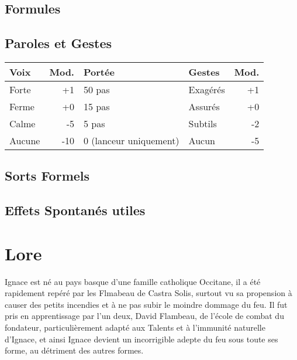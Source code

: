 \magusArtsLong

\subsection*{Formules}
\begin{multicols}{2}
\castingformulas

\begin{small}
\end{small}

\end{multicols}
\subsection*{Paroles et Gestes}
\begin{tabularx}{\textwidth}{|X|r|l||X|r|}
\hline
Voix   & Mod. & Portée                          & Gestes   & Mod. \\ \hline
Forte  &  +1  & 50 pas                          & Exagérés & +1 \\
Ferme  &  +0  & 15 pas                          & Assurés  & +0 \\
Calme  &  -5  & 5 pas                           & Subtils  & -2 \\
Aucune & -10  & 0 {\small (lanceur uniquement)} & Aucun    & -5 \\ \hline
\end{tabularx}
\pagebreak
\subsection*{Sorts Formels}
\begin{multicols}{2}
\longspells
\end{multicols}
\subsection*{Effets Spontanés utiles}

\begin{multicols}{2}

\end{multicols}

\pagebreak

\section*{Lore}
Ignace est né au pays basque d'une famille catholique Occitane, il a été rapidement repéré par les Flmabeau de Castra Solis, surtout vu sa propension à causer des petits incendies et à ne pas subir le moindre dommage du feu. Il fut pris en apprentissage par l'un deux, David Flambeau, de l'école de combat du fondateur, particulièrement adapté aux Talents et à l'immunité naturelle d'Ignace, et ainsi Ignace devient un incorrigible adepte du feu sous toute ses forme, au détriment des autres formes.

